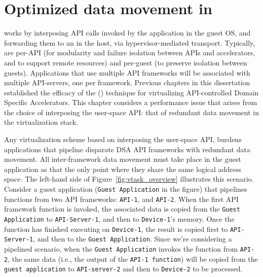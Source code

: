 \chapter{Optimized data movement in \hira}\label{chapter:vTask}


\hirafull works by interposing API calls invoked by the application in the
guest OS, and forwarding them to an \worker in the host, via
hypervisor-mediated transport. Typically, \workers are per-API (for modularity
and failure isolation between APIs and accelerators, and to support remote
resources) and per-guest (to preserve isolation between guests). Applications
that use multiple API frameworks will be associated with multiple API-servers,
one per framework. Previous chapters in this dissertation established the
efficacy of the \hirafull (\hira) technique for virtualizing API-controlled
Domain Specific Accelerators. This chapter considers a performance issue that
arises from the choice of interposing the user-space API: that of redundant
data movement in the virtualization stack.

Any virtualization scheme based on interposing the user-space API, burdens
applications that pipeline disparate DSA API frameworks with redundant data
movement. All inter-framework data movement must take place in the guest
application as that the only point where they share the same logical address
space. The left-hand side of Figure~\ref{fig:vtask_overview} illustrates this
scenario. Consider a guest application (\texttt{Guest Application} in the
figure) that pipelines functions from two API frameworks: \texttt{API-1}, and
\texttt{API-2}. When the first API framework function is invoked, the
associated data is copied from the \texttt{Guest Application} to
\texttt{API-Server-1}, and then to \texttt{Device-1}’s memory. Once the
function has finished executing on \texttt{Device-1}, the result is copied
first to \texttt{API-Server-1}, and then to the \texttt{Guest Application}.
Since we're considering a pipelined scenario, when the \texttt{Guest
  Application} invokes the function from \texttt{API-2}, the same data (i.e.,
the output of the \texttt{API-1 function}) will be copied from the
\texttt{guest application} to \texttt{API-server-2} and then to
\texttt{Device-2} to be processed.

